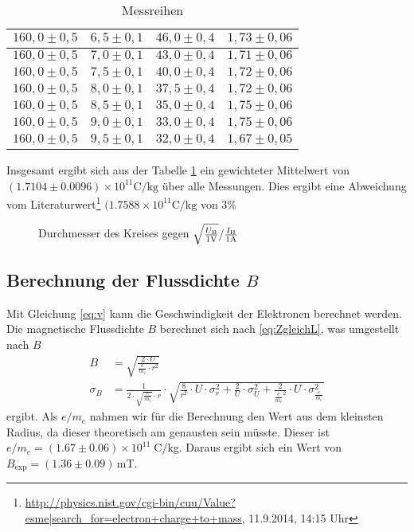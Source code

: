 \documentclass[12pt,a4paper,titlepage,headinclude,bibtotoc]{scrartcl}
\numberwithin{equation}{section}
\begin{document}
\begin{table}[h!]
\begin{tabular}{|c|c|c|c|}
		 \hline                         
		 $160,0 \pm 0,5$ & $6,5 \pm 0,1$& $46,0 \pm 0,4$ & $1,73 \pm 0,06$\\
		 \hline                         
		 $160,0 \pm 0,5$ & $7,0 \pm 0,1$& $43,0 \pm 0,4$ & $1,71 \pm 0,06$\\
		 \hline                         
		 $160,0 \pm 0,5$ & $7,5 \pm 0,1$& $40,0 \pm 0,4$ & $1,72 \pm 0,06$\\
		 \hline                         
		 $160,0 \pm 0,5$ & $8,0 \pm 0,1$& $37,5 \pm 0,4$ & $1,72 \pm 0,06$\\
		 \hline                         
		 $160,0 \pm 0,5$ & $8,5 \pm 0,1$& $35,0 \pm 0,4$ & $1,75 \pm 0,06$\\
		 \hline                         
		 $160,0 \pm 0,5$ & $9,0 \pm 0,1$& $33,0 \pm 0,4$ & $1,75 \pm 0,06$\\
		 \hline                         
		 $160,0 \pm 0,5$ & $9,5 \pm 0,1$& $32,0 \pm 0,4$ & $1,67 \pm 0,05$\\
		  \hline
	  \end{tabular}
	  \caption{Messreihen}
	  \label{tbl:pythonmessung}
  \end{table}
Insgesamt ergibt sich aus der Tabelle \ref{tbl:pythonmessung} ein gewichteter Mittelwert von $(1.7104 \pm 0.0096)\times 10^{11}\si{\coulomb/\kilo\gram}$ über alle Messungen.
Dies ergibt eine Abweichung vom Literaturwert\footnote{\url{http://physics.nist.gov/cgi-bin/cuu/Value?esme|search_for=electron+charge+to+mass}, 11.9.2014, 14:15 Uhr} $(1.7588\times 10^{11}\si{\coulomb/\kilo\gram}$ von $3\%$

\begin{figure}[!h]
	\centering
	
	\caption{Durchmesser des Kreises gegen $\sqrt{\frac{U_\text{B}}{1\text V}}/\frac{I_\text{H}}{1\text A}$}
	\label{fig:eric}
\end{figure}
\subsection{Berechnung der Flussdichte $B$}
Mit Gleichung \eqref{eq:v} kann die Geschwindigkeit der Elektronen berechnet werden.
Die magnetische Flussdichte $B$ berechnet sich nach \eqref{eq:ZgleichL}, was umgestellt nach $B$
\begin{align*}
B&=\sqrt{\frac{2\cdot U}{\frac{e}{m_e} \cdot r^{2}}}\label{eq:B}\\
\sigma_B&=\frac{1}{2 \cdot \sqrt{\frac{e}{m_e}} \cdot r} \cdot \sqrt{\frac{8}{r^{2}} \cdot U \cdot \sigma_{r}^{2} + \frac{2}{U} \cdot \sigma_{U}^{2} + \frac{2}{\frac{e}{m_e}^{2}} \cdot U \cdot \sigma_{\frac{e}{m_e}}^{2}}
\end{align*}
ergibt.
Als $e/m_e$ nahmen wir für die Berechnung den Wert aus dem kleinsten Radius, da dieser theoretisch am genausten sein müsste.
Dieser ist $e/m_e=(1.67\pm0.06)\times 10^{11}\;$C/kg.
Daraus ergibt sich ein Wert von $B_\text{exp}=(1.36 \pm 0.09)\,$mT.
\end{document}

